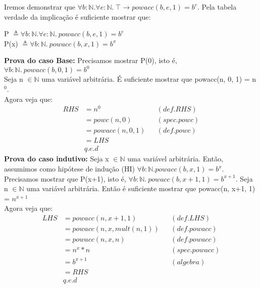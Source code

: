 \documentclass{article}
\begin{document}
\noindent Iremos demonstrar que
$\forall b:\mathbb{N}. \forall e:\mathbb{N}.\: \top \rightarrow powacc(b, e, 1) = b^e$.
Pela tabela verdade da implicação é suficiente mostrar que:\\
\begin{center}
P $\triangleq \forall b:\mathbb{N}. \forall e:\mathbb{N}.\: powacc(b, e, 1) = b^e$\\
P(x) $\triangleq \forall b:\mathbb{N}.\: powacc(b, x, 1) = b^x$\\
\end{center}
\noindent\textbf{Prova do caso Base:}
Precisamos mostrar P(0), isto é, $\forall b:\mathbb{N}.\: powacc(b, 0, 1) = b^0$\\
Seja n $\in \mathbb{N}$ uma variável arbitrária. É suficiente mostrar que powacc(n, 0, 1) = n$^0$.\\
Agora veja que:
\begin{align*}
RHS &= n^0 && (def. RHS)\\
&= powc(n, 0) && (spec. powc)\\
&= powacc(n, 0, 1) && (def. powc)\\
&= LHS\\
& q.e.d
\end{align*}
\noindent\textbf{Prova do caso indutivo:}
Seja x $\in \mathbb{N}$ uma variável arbitrária. Então, assumimos como hipótese de indução (HI)
$\forall b:\mathbb{N}. powacc(b, x, 1) = b^x$.
Precisamos mostrar que P(x+1), isto é, $\forall b: \mathbb{N}.\: powacc(b, x+1, 1) = b^{x+1}$.
Seja n $\in \mathbb{N}$ uma variável arbitrária. Então é suficiente mostrar que powacc(n, x+1, 1) = $n^{x+1}$\\
Agora veja que:
\begin{align*}
LHS &= powacc(n, x+1, 1) && (def. LHS)\\
&= powacc(n, x, mult(n, 1)) && (def. powacc)\\
&= powacc(n, x, n) && (def. powacc)\\
&= n^x * n && (spec. powacc)\\
&= b^{x+1} && (algebra)\\
&= RHS\\
& q.e.d
\end{align*}
\end{document}
